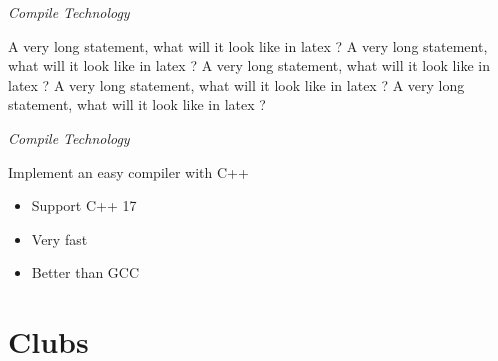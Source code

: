 \textit{Compile Technology}
\vspace{0.4ex}

A very long statement, what will it look like in latex ?
A very long statement, what will it look like in latex ?
A very long statement, what will it look like in latex ?
A very long statement, what will it look like in latex ?
A very long statement, what will it look like in latex ?

\textit{Compile Technology}
\vspace{0.4ex}

Implement an easy compiler with C++
\begin{itemize}
  \item Support C++ 17
  \item Very fast
  \item Better than GCC
\end{itemize}



\section{Clubs}
